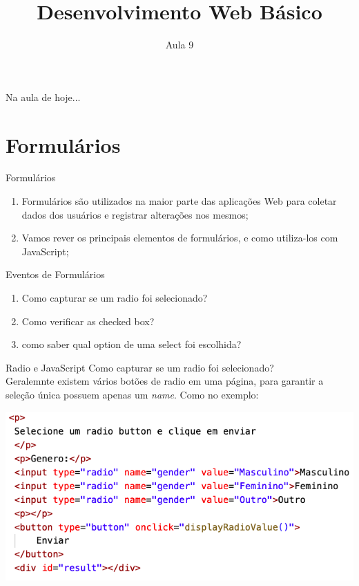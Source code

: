 \documentclass{beamer}
\title{Desenvolvimento Web Básico}
\subtitle{Aula 9}
\begin{document}
\frame{
 \titlepage
}

\begin{frame}{Na aula de hoje...} 
\tableofcontents 
\end{frame}

\section{Formulários}
\begin{frame}{Formulários}
  \begin{enumerate}
      \item Formulários são utilizados na maior parte das aplicações Web para coletar dados dos usuários e registrar alterações nos mesmos;
      \item Vamos rever os principais elementos de formulários, e como utiliza-los com JavaScript;
  \end{enumerate}
\end{frame}
\begin{frame}{ Eventos de Formulários}
  \begin{enumerate}
      \item Como capturar se um radio foi selecionado?
      \item Como verificar as checked box?
      \item como saber qual option de uma select foi escolhida?
  \end{enumerate}
\end{frame}
\begin{frame}{Radio e JavaScript}
Como capturar se um radio foi selecionado?\\
Geralemnte existem vários botões de radio em uma página, para garantir a seleção única possuem apenas um \textit{name}. Como no exemplo:
\begin{center}
    \includegraphics[height=0.5\paperheight]{fig/aula7/aula7_1.png}
\end{center}

\end{frame}
\end{document}
